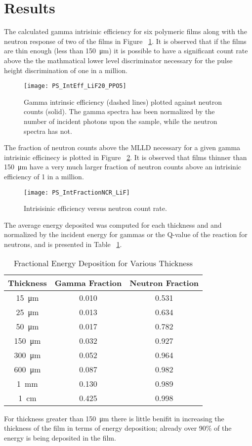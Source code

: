 \documentclass[draftcls,onecolumn]{IEEEtran}
\begin{document}
\section{Results}
\label{sec:Results}
The calculated gamma intrisinic efficiency for six polymeric films along with the neutron response of two of the films in Figure ~\ref{fig:GammaIntrNeutronCounts}. 
It is observed that if the films are thin enough (less than \SI{150}{\um}) it is possible to have a significant count rate above the the mathmatical lower level discriminator necessary for the pulse height discrimination of one in a million.
\begin{figure}[ht]
    \centering
    \texttt{[image: PS\_IntEff\_LiF20\_PPO5]}
    \caption{Gamma intrinsic efficiency (dashed lines) plotted against neutron counts (solid). The gamma spectra has been normalized by the number of incident photons upon the sample, while the neutron spectra has not.}
    \label{fig:GammaIntrNeutronCounts}
\end{figure}
The fraction of neutron counts above the MLLD necessary for a given gamma intrisinic efficinecy is plotted in Figure ~\ref{fig:crVsIntEff}.
It is observed that films thinner than \SI{150}{\um} have a very much larger fraction of neutron counts above an intrisinic efficiency of 1 in a million.
\begin{figure}[ht]
    \centering
    \texttt{[image: PS\_IntFractionNCR\_LiF]}
    \caption{Intrisisinic efficiency versus neutron count rate. }
    \label{fig:crVsIntEff}
\end{figure}

The average energy deposited was computed for each thickness and and normalized by the incident energy for gammas or the Q-value of the reaction for neutrons, and is presented in Table ~\ref{tab:FractionEDep}.
\begin{table}[ht]
    \caption{Fractional Energy Deposition for Various Thickness}
	\centering
	\begin{tabular}{c | c c}
	Thickness & Gamma Fraction & Neutron Fraction \\
	\hline
	\hline
	\SI{15}{\um} & 0.010 & 0.531 \\
	\SI{25}{\um} & 0.013 & 0.634 \\
	\SI{50}{\um} & 0.017 & 0.782 \\
	\SI{150}{\um} & 0.032 & 0.927 \\
	\SI{300}{\um} & 0.052 & 0.964 \\
	\SI{600}{\um} & 0.087 & 0.982 \\
	\SI{1}{\mm} & 0.130 & 0.989 \\
	\SI{1}{\cm} & 0.425 & 0.998 \\
	\hline
	\end{tabular}
    \label{tab:FractionEDep}
\end{table}
For thickness greater than \SI{150}{\um} there is little benifit in increasing the thickness of the film in terms of energy deposition; already over 90\% of the energy is being deposited in the film.
\end{document}
